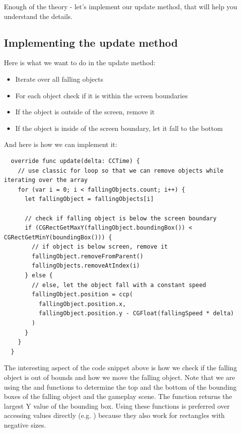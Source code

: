 Enough of the theory - let's implement our update method, that will help you
understand the details.

\subsection{Implementing the update method}
Here is what we want to do in the update method:

\begin{itemize}
  \item Iterate over all falling objects
  \item For each object check if it is within the screen boundaries
  \item If the object is outside of the screen, remove it
  \item If the object is inside of the screen boundary, let it fall to the
  bottom
\end{itemize}

And here is how we can implement it:

\begin{lstlisting}
  override func update(delta: CCTime) {
    // use classic for loop so that we can remove objects while iterating over the array
    for (var i = 0; i < fallingObjects.count; i++) {
      let fallingObject = fallingObjects[i]
      
      // check if falling object is below the screen boundary
      if (CGRectGetMaxY(fallingObject.boundingBox()) < CGRectGetMinY(boundingBox())) {
        // if object is below screen, remove it
        fallingObject.removeFromParent()
        fallingObjects.removeAtIndex(i)
      } else {
        // else, let the object fall with a constant speed
        fallingObject.position = ccp(
          fallingObject.position.x,
          fallingObject.position.y - CGFloat(fallingSpeed * delta)
        )
      }
    }
  }
\end{lstlisting}

The interesting aspect of the code snippet above is how we check if the
falling object is out of bounds and how we move the falling object. Note that we
are using the  and 
functions to determine the top and the bottom of the bounding boxes of the
falling object and the gameplay scene. The  function
returns the largest Y value of the bounding box. Using these functions is preferred over accessing values
directly (e.g. ) because they
also work for rectangles with negative sizes.

